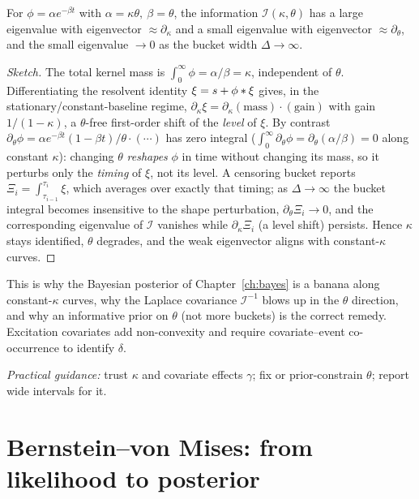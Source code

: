 \begin{proposition}\label{prop:ridge-degenerate}
For $\phi=\alpha e^{-\beta t}$ with $\alpha=\kappa\theta,\ \beta=\theta$, the
information $\mathcal I(\kappa,\theta)$ has a large eigenvalue with eigenvector
$\approx\partial_\kappa$ and a small eigenvalue with eigenvector $\approx\partial_\theta$,
and the small eigenvalue $\to0$ as the bucket width $\Delta\to\infty$.
\end{proposition}
\begin{proof}[Sketch]
The total kernel mass is $\int_0^\infty\phi=\alpha/\beta=\kappa$, independent of
$\theta$. Differentiating the resolvent identity $\xi=s+\phi\ast\xi$ gives, in the
stationary/constant-baseline regime, $\partial_\kappa\xi=\partial_\kappa(\text{mass})\cdot(\text{gain})$
with gain $1/(1-\kappa)$, a $\theta$-free first-order shift of the \emph{level} of
$\xi$. By contrast $\partial_\theta\phi=\alpha e^{-\beta t}(1-\beta t)/\theta\cdot(\cdots)$
has zero integral ($\int_0^\infty\partial_\theta\phi=\partial_\theta(\alpha/\beta)=0$
along constant $\kappa$): changing $\theta$ \emph{reshapes} $\phi$ in time without
changing its mass, so it perturbs only the \emph{timing} of $\xi$, not its level.
A censoring bucket reports $\Xi_i=\int_{\tau_{i-1}}^{\tau_i}\xi$, which averages over
exactly that timing; as $\Delta\to\infty$ the bucket integral becomes insensitive to
the shape perturbation, $\partial_\theta\Xi_i\to0$, and the corresponding eigenvalue
of $\mathcal I$ vanishes while $\partial_\kappa\Xi_i$ (a level shift) persists. Hence
$\kappa$ stays identified, $\theta$ degrades, and the weak eigenvector aligns with
constant-$\kappa$ curves.
\end{proof}

\begin{remarknote}
This is why the Bayesian posterior of Chapter~\ref{ch:bayes} is a banana along
constant-$\kappa$ curves, why the Laplace covariance $\mathcal I^{-1}$ blows up in
the $\theta$ direction, and why an informative prior on $\theta$ (not more buckets)
is the correct remedy. Excitation covariates add non-convexity and require
covariate--event co-occurrence to identify $\delta$.
\end{remarknote}
\emph{Practical guidance:} trust $\kappa$ and covariate effects $\gamma$; fix or
prior-constrain $\theta$; report wide intervals for it.

\section{Bernstein--von Mises: from likelihood to posterior}

